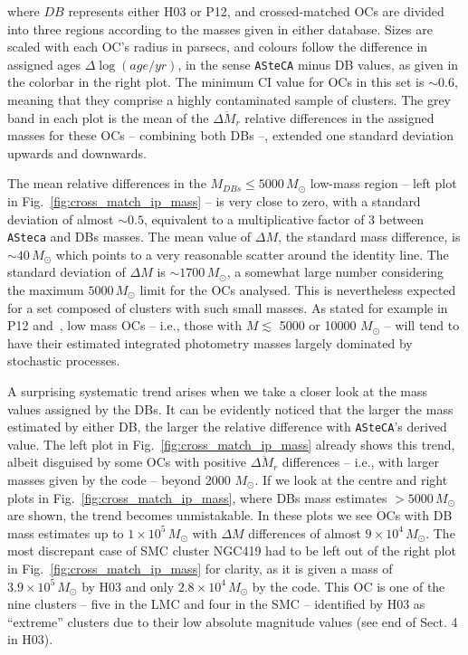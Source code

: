 \documentclass[a4paper,fleqn,usenatbib]{mnras}
\begin{document}
\noindent where $DB$ represents either H03 or P12, and crossed-matched OCs are
divided into three regions according to the masses given in either database.
%
Sizes are scaled with each OC's radius in parsecs, and colours follow the
difference in assigned ages $\Delta \log(age/yr)$, in the sense \texttt{ASteCA}
minus DB values, as given in the colorbar in the right plot.
The minimum CI value for OCs in this set is ${\sim}0.6$, meaning that they
comprise a highly contaminated sample of clusters.
The grey band in each plot is the mean of the $\overline{\Delta M_r}$ relative
differences in the assigned masses for these OCs -- combining both DBs --,
extended one standard deviation upwards and downwards.

The mean relative differences in the $M_{DBs}\le5000\,M_{\odot}$ low-mass
region -- left plot in Fig.~\ref{fig:cross_match_ip_mass} -- is very close to
zero, with a standard deviation of almost ${\sim}0.5$, equivalent to a
multiplicative factor of 3 between \texttt{ASteca} and DBs masses.
%
The mean value of $\Delta M$, the standard mass difference, is
$\sim40\,M_{\odot}$ which points to a very reasonable scatter around the
identity line. The standard deviation of $\Delta M$ is ${\sim}1700\,M_{\odot}$,
a somewhat large number considering the maximum $5000\,M_{\odot}$ limit for the
OCs analysed. This is nevertheless expected for a set composed of clusters with
such small masses.
As stated for example in P12 and~\cite{Baumgardt_2013}, low mass OCs -- i.e.,
those with $M{\lesssim}$ 5000 or 10000 $M_{\odot}$ -- will tend to have their
estimated integrated photometry masses largely dominated by stochastic
processes.

A surprising systematic trend arises when we take a closer look at the mass
values assigned by the DBs. It can be evidently noticed that the larger the
mass estimated by either DB, the larger the relative difference with 
\texttt{ASteCA}'s derived value. The left plot in
Fig.~\ref{fig:cross_match_ip_mass} already shows this trend, albeit disguised by
some OCs with positive $\overline{\Delta M_r}$ differences --
i.e., with larger masses given by the code -- beyond 2000 $M_{\odot}$.
%
If we look at the centre and right plots in Fig.~\ref{fig:cross_match_ip_mass},
where DBs mass estimates $>5000\,M_{\odot}$ are shown, the trend becomes
unmistakable.
In these plots we see OCs with DB mass estimates up to $1{\times}10^5\,M_{\odot}$
with $\Delta M$ differences of almost $9{\times}10^4\,M_{\odot}$.
The most discrepant case of SMC cluster NGC419 had to be left out of the right
plot in Fig.~\ref{fig:cross_match_ip_mass} for clarity, as it is given a mass of
$3.9{\times}10^5\,M_{\odot}$ by H03 and only $2.8{\times}10^4\,M_{\odot}$ by the
code. This OC is one of the nine clusters -- five in the LMC and four in the SMC
-- identified by H03 as ``extreme'' clusters due to their low absolute magnitude
values (see end of Sect. 4 in H03).
\end{document}
